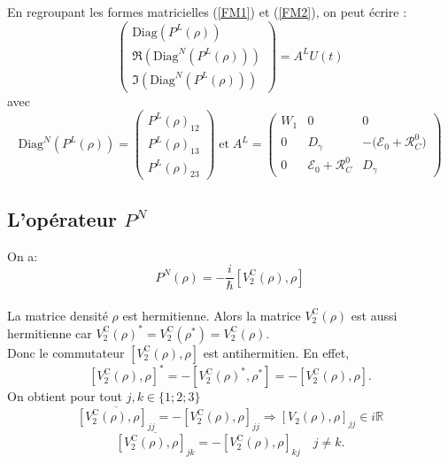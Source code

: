\documentclass[12pt,a4paper,openany,oneside]{book}
\begin{document}
{{{{{{En regroupant les formes matricielles (\ref{FM1}) et (\ref{FM2}), on peut écrire :
\begin{equation}\label{matricePL}
\begin{pmatrix} \textrm{Diag}(P^{L}(\rho)) \\ \Re(\textrm{Diag}^{N}(P^{L}(\rho))) \\ \Im(\textrm{Diag}^{N}(P^{L}(\rho)))\end{pmatrix} = A^{L}U(t)
\end{equation} 
avec
\begin{equation}
 \textrm{Diag}^{N}(P^{L}(\rho))= \begin{pmatrix} P^{L}(\rho)_{12} \\ P^{L}(\rho)_{13} \\ P^{L}(\rho)_{23}\end{pmatrix}
\; \mathrm{et} \; 
A^{L}=
\begin{pmatrix}
W_{1} &      0                    & 0                       \\
    0 & D_{\gamma}                &  -\big(\mathcal{E}_{0}+\mathcal{R}^{0}_{C}\big)  \\
    0 & \mathcal{E}_{0}+ \mathcal{R}^{0}_{C}  &  D_{\gamma}
\end{pmatrix}\label{matrice Al}
\end{equation}

\subsection{L'opérateur $  P^{N} $} 
On a:
\begin{equation}\label{second membre non linéaire} 
P^{N}(\rho)= -\dfrac{i}{\hbar}[V_{2}^{\textrm{C}}(\rho),\rho]
\end{equation}\\


La matrice densité $ \rho $ est hermitienne. Alors la matrice $ V_{2}^{\textrm{C}}(\rho) $ est aussi hermitienne car 
$ V_{2}^{\textrm{C}}(\rho)^{*} = V_{2}^{\textrm{C}}(\rho^{*})= V_{2}^{\textrm{C}}(\rho) $.\\
Donc le commutateur $ [V_{2}^{\textrm{C}}(\rho),\rho] $ est antihermitien. En effet,
$$ [V_{2}^{\textrm{C}}(\rho),\rho]^{*} = -[V_{2}^{\textrm{C}}(\rho)^{*},\rho^{*}]= -[V_{2}^{\textrm{C}}(\rho),\rho] .$$
On obtient pour tout $ j,k \in \{1;2;3\} $
$$
\overline{[V_{2}^{\textrm{C}}(\rho),\rho]_{jj}} = -[V_{2}^{\textrm{C}}(\rho),\rho]_{jj} \Rightarrow[V_{2}(\rho),\rho]_{jj} \in i\mathbb{R}
$$
$$
\overline{[V_{2}^{\textrm{C}}(\rho),\rho]_{jk}} = -[V_{2}^{\textrm{C}}(\rho),\rho]_{kj} \quad j\neq k.
$$\\

}}}}}}
\end{document}
